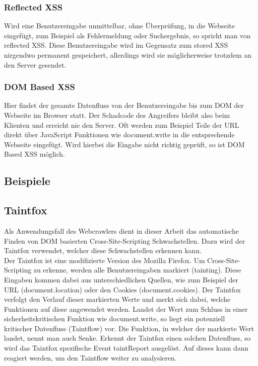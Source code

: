 \subsubsection{Reflected XSS}
Wird eine Benutzereingabe unmittelbar, ohne Überprüfung, in die Webseite eingefügt, zum Beispiel als Fehlermeldung oder Suchergebnis, so spricht man von reflected XSS. Diese Benutzereingabe wird im Gegensatz zum stored XSS nirgendwo permanent gespeichert, allerdings wird sie möglicherweise trotzdem an den Server gesendet.
\subsubsection{DOM Based XSS}
Hier findet der gesamte Datenfluss von der Benutzereingabe bis zum DOM der Webseite im Browser statt. Der Schadcode des Angreifers bleibt also beim Klienten und erreicht nie den Server. Oft werden zum Beispiel Teile der URL direkt über JavaScript Funktionen wie document.write in die entsprechende Webseite eingefügt. Wird hierbei die Eingabe nicht richtig geprüft, so ist DOM Based XSS möglich.
\subsection{Beispiele}

\subsection{Taintfox}
Als Anwendungsfall des Webcrawlers dient in dieser Arbeit das automatische Finden von DOM basierten Cross-Site-Scripting Schwachstellen. Dazu wird der Taintfox verwendet, welcher diese Schwachstellen erkennen kann. \\
Der Taintfox ist eine modifizierte Version des Mozilla Firefox. Um Cross-Site-Scripting zu erkenne, werden alle Benutzereingaben markiert (tainting). Diese Eingaben kommen dabei aus unterschiedlichen Quellen, wie zum Beispiel der URL (document.location) oder den Cookies (document.cookies). Der Taintfox verfolgt den Verlauf dieser markierten Werte und merkt sich dabei, welche Funktionen auf diese angewendet werden. Landet der Wert zum Schluss in einer sicherheitskritischen Funktion wie document.write, so liegt ein potenziell kritischer Datenfluss (Taintflow) vor. Die Funktion, in welcher der markierte Wert landet, nennt man auch Senke. Erkennt der Taintfox einen solchen Datenfluss, so wird das Taintfox spezifische Event taintReport ausgelöst. Auf dieses kann dann reagiert werden, um den Taintflow weiter zu analysieren.


